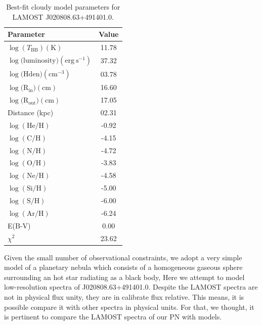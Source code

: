 \documentclass[fleqn,usenatbib]{mnras}
\begin{document}
\begin{table}
	\centering
	\caption{Best-fit {\sc cloudy} model parameters for LAMOST J020808.63+491401.0.}
	\label{tab:parameter-best-fit}
	\begin{tabular}{lc} %
                \hline
		\hline
		Parameter & Value \\
                \hline
		$\log(T_{\mathrm{BB}}) (\mathrm{K})$  & 11.78  \\
		$\log(\mathrm{luminosity) (erg~s^{-1})}$ & 37.32 \\
		$\log(\mathrm{Hden) (cm^{-3})} $ & 03.78  \\
                 $\log(\mathrm{R_{in}) (cm)}$ &  16.60\\
                $\log(\mathrm{R_{out}) (cm)}$ & 17.05 \\
                Distance (kpc) & 02.31  \\
                $\log(\mathrm{He/H})$ & -0.92 \\
                $\log(\mathrm{C/H})$ & -4.15 \\
                $\log(\mathrm{N/H})$ & -4.72 \\
                $\log(\mathrm{O/H})$ &  -3.83\\ 
                $\log(\mathrm{Ne/H})$ & -4.58 \\
                $\log(\mathrm{Si/H})$ & -5.00\\ 
                $\log(\mathrm{S/H})$ &  -6.00\\ 
                $\log(\mathrm{Ar/H})$ & -6.24\\
                \hline
                E(B-V) & 0.00 \\
                 $\chi^2$ & 23.62  \\
                 
                 \hline
	\end{tabular}
\end{table}

Given the small number of observational constraints, we adopt a very
simple model of a planetary nebula which consists of a homogeneous
gaseous sphere surrounding an hot star radiating as a black body,
Here we attempt to model low-resolution spectra of J020808.63+491401.0.
Despite the LAMOST spectra are not in physical flux unity,
they are in calibrate flux relative. This means, it is possible compare it with other
spectra in physical units. For that, we thought, it is pertinent to
compare the LAMOST spectra of our PN with models.
\end{document}
